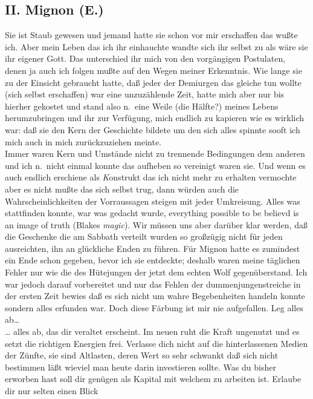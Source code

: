 \documentclass[
]{article}
\author{}
\date{\vspace{-2.5em}}
\begin{document}
\subsection{II. Mignon (E.)}\label{ii.-mignon-e.}

Sie ist Staub gewesen und jemand hatte sie schon vor mir erschaffen das
wußte ich. Aber mein Leben das ich ihr einhauchte wandte sich ihr selbst
zu als wäre sie ihr eigener Gott. Das unterschied ihr mich von den
vorgängigen Postulaten, denen ja auch ich folgen mußte auf den Wegen
meiner Erkenntnis. Wie lange sie zu der Einsicht gebraucht hatte, daß
jeder der Demiurgen das gleiche tun wollte (sich selbst erschaffen) war
eine unzuzählende Zeit, hatte mich aber nur bis hierher gekostet und
stand also n.~eine Weile (die Hälfte?) meines Lebens herumzubringen und
ihr zur Verfügung, mich endlich zu kapieren wie es wirklich war: daß sie
den Kern der Geschichte bildete um den sich alles spinnte sooft ich mich
auch in mich zurückzuziehen meinte.\\
Immer waren Kern und Umstände nicht zu trennende Bedingungen dem anderen
und ich n.~nicht einmal konnte das aufheben so vereinigt waren sie. Und
wenn es auch endlich erschiene als \emph{K}onstrukt das ich nicht mehr
zu erhalten vermochte aber es nicht mußte das sich selbst trug, dann
würden auch die Wahrscheinlichkeiten der Vorraussagen steigen mit jeder
Umkreisung. Alles was stattfinden konnte, war was gedacht wurde,
everything possible to be believ\textquotesingle d is an image of truth
(Blake\textquotesingle s \emph{magic}). Wir müssen uns aber darüber klar
werden, daß die Geschenke die am Sabbath verteilt wurden so großzügig
nicht für jeden ausreichten, ihn an glückliche Enden zu führen. Für
Mignon hatte es zumindest ein Ende schon gegeben, bevor ich sie
entdeckte; deshalb waren meine täglichen Fehler nur wie die des
Hütejungen der jetzt dem echten Wolf gegenüberstand. Ich war jedoch
darauf vorbereitet und nur das Fehlen der dummenjungenstreiche in der
ersten Zeit bewies daß es sich nicht um wahre Begebenheiten handeln
konnte sondern alles erfunden war. Doch diese Färbung ist mir nie
aufgefallen. Leg alles ab\ldots{}\\
\ldots{} alles ab, das dir veraltet erscheint. Im neuen ruht die Kraft
ungenutzt und es setzt die richtigen Energien frei. Verlasse dich nicht
auf die hinterlassenen Medien der Zünfte, sie sind Altlasten, deren Wert
so sehr schwankt daß sich nicht bestimmen läßt wieviel man heute darin
investieren sollte. Was du bisher erworben hast soll dir genügen als
Kapital mit welchem zu arbeiten ist. Erlaube dir nur selten einen Blick
\end{document}
